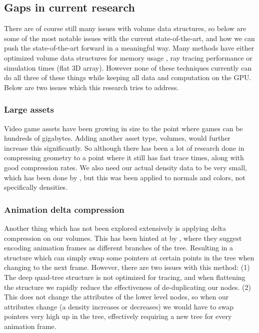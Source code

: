 \clearpage\subsection{Gaps in current research} \label{introduction:gaps_in_current_research}
There are of course still many issues with volume data structures, so below are some of the most notable issues with the current state-of-the-art, and how we can push the state-of-the-art forward in a meaningful way. Many methods have either optimized volume data structures for memory usage \cite{laine2010efficient}\cite{kampe2013high}, ray tracing performance \cite{van2015real} \cite{soderlund2022ray} \cite{museth2013vdb} or simulation times (flat 3D array). However none of these techniques currently can do all three of these things while keeping all data and computation on the GPU. Below are two issues which this research tries to address.
\subsubsection{Large assets} \label{introduction:gaps_in_current_research:large_assets}
Video game assets have been growing in size to the point where games can be hundreds of gigabytes. Adding another asset type, volumes, would further increase this significantly. So although there has been a lot of research done in compressing geometry to a point where it still has fast trace times, along with good compression rates\cite{van2015real}\cite{museth2013vdb}. We also need our actual density data to be very small, which has been done by \cite{dado2016geometry}, but this was been applied to normals and colors, not specifically densities.
\subsubsection{Animation delta compression} \label{introduction:gaps_in_current_research:animation_delta_compression}
Another thing which has not been explored extensively is applying delta compression on our volumes. This has been hinted at by \cite{careil2020interactively}, where they suggest encoding animation frames as different branches of the tree. Resulting in a structure which can simply swap some pointers at certain points in the tree when changing to the next frame. However, there are two issues with this method: (1) The deep quad-tree structure is not optimized for tracing, and when flattening the structure we rapidly reduce the effectiveness of de-duplicating our nodes. (2) This does not change the attributes of the lower level nodes, so when our attributes change (a density increases or decreases) we would have to swap pointers very high up in the tree, effectively requiring a new tree for every animation frame.




